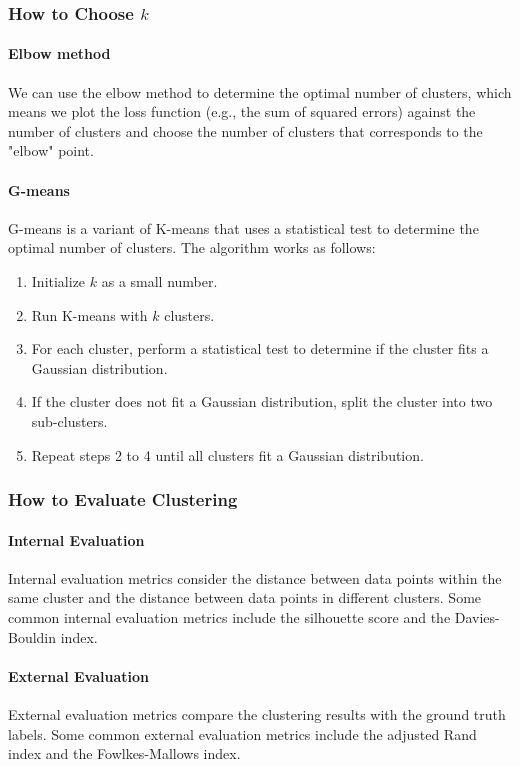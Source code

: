 \documentclass[a4paper,12pt]{article}
\begin{document}
\subsubsection{How to Choose $k$} 

\paragraph{Elbow method}We can use the elbow method to determine the optimal number of clusters, which means we plot the loss function (e.g., the sum of squared errors) against the number of clusters and choose the number of clusters that corresponds to the "elbow" point.

\paragraph{G-means} G-means is a variant of K-means that uses a statistical test to determine the optimal number of clusters. The algorithm works as follows:
\begin{enumerate}
  \item Initialize $k$ as a small number.
  \item Run K-means with $k$ clusters.
  \item For each cluster, perform a statistical test to determine if the cluster fits a Gaussian distribution.
  \item If the cluster does not fit a Gaussian distribution, split the cluster into two sub-clusters.
  \item Repeat steps 2 to 4 until all clusters fit a Gaussian distribution.
\end{enumerate}

\subsubsection{How to Evaluate Clustering}

\paragraph{Internal Evaluation} Internal evaluation metrics consider the distance between data points within the same cluster and the distance between data points in different clusters. Some common internal evaluation metrics include the silhouette score and the Davies-Bouldin index.

\paragraph{External Evaluation} External evaluation metrics compare the clustering results with the ground truth labels. Some common external evaluation metrics include the adjusted Rand index and the Fowlkes-Mallows index.
\end{document}
